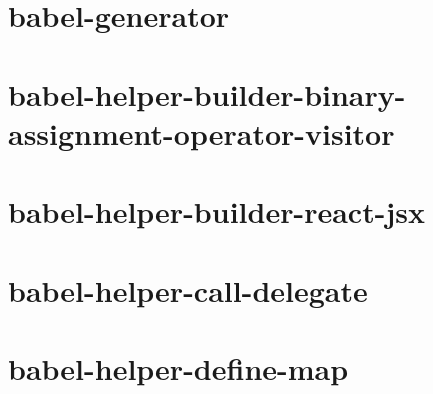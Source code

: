 \documentclass[twoside]{book}
\newcommand{\+}{\discretionary{\mbox{\scriptsize$\hookleftarrow$}}{}{}}
\begin{document}
\chapter{babel-\/generator}
\label{md__c_1_workspace_demo_src_main_script_node_modules_babel-generator__r_e_a_d_m_e}

\chapter{babel-\/helper-\/builder-\/binary-\/assignment-\/operator-\/visitor}
\label{md__c_1_workspace_demo_src_main_script_node_modules_babel-helper-builder-binary-assignment-operator-visitor__r_e_a_d_m_e}

\chapter{babel-\/helper-\/builder-\/react-\/jsx}
\label{md__c_1_workspace_demo_src_main_script_node_modules_babel-helper-builder-react-jsx__r_e_a_d_m_e}

\chapter{babel-\/helper-\/call-\/delegate}
\label{md__c_1_workspace_demo_src_main_script_node_modules_babel-helper-call-delegate__r_e_a_d_m_e}

\chapter{babel-\/helper-\/define-\/map}
\label{md__c_1_workspace_demo_src_main_script_node_modules_babel-helper-define-map__r_e_a_d_m_e}

\end{document}

